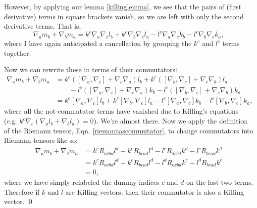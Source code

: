 However, by applying our lemma \eqref{killinglemma}, we see that the pairs of (first derivative) terms in square brackets vanish, so we are left with only the second derivative terms. That is,
$$\nabla_a m_b + \nabla_b m_a =k^c \nabla_a \nabla_c l_b + k^c \nabla_b \nabla_c l_a- l^c \nabla_a \nabla_c k_b  - l^c \nabla_b \nabla_c k_a,$$
where I have again anticipated a cancellation by grouping the $k^c$ and $l^c$ terms together.

Now we can rewrite these in terms of their commutators:
\begin{align*}
\nabla_a m_b + \nabla_b m_a &=k^c ([\nabla_a,\nabla_c]+\nabla_c\nabla_a) l_b + k^c ([\nabla_b,\nabla_c]+\nabla_c\nabla_b) l_a\\
&{}\qquad- l^c ([\nabla_a,\nabla_c]+\nabla_c\nabla_a) k_b  - l^c ([\nabla_b,\nabla_c]+\nabla_c\nabla_b) k_a\\
&= k^c [\nabla_a,\nabla_c] l_b + k^c [\nabla_b,\nabla_c]l_a - l^c [\nabla_a,\nabla_c]k_b  - l^c [\nabla_b,\nabla_c]k_a,
\end{align*}
where all the not-commutator terms have vanished due to Killing's equations (e.g. $k^c \nabla_c (\nabla_a l_b + \nabla_b l_a)=0$). We're almost there. Now we apply the definition of the Riemann tensor, Eqn. \eqref{riemannascommutator}, to change commutators into Riemann tensors like so:
\begin{align*}
\nabla_a m_b + \nabla_b m_a &= k^c R_{acbd} l^d + k^c R_{bcad} l^d -l^c R_{acbd} k^d -l^c R_{bcad} k^d\\
&= k^c R_{acbd} l^d + k^c R_{bcad} l^d -l^d R_{acbd} k^c -l^d R_{bcad} k^c\\
&=0,
\end{align*}
where we have simply relabeled the dummy indices $c$ and $d$ on the last two terms. Therefore if $k$ and $l$ are Killing vectors, then their commutator is also a Killing vector. \qed